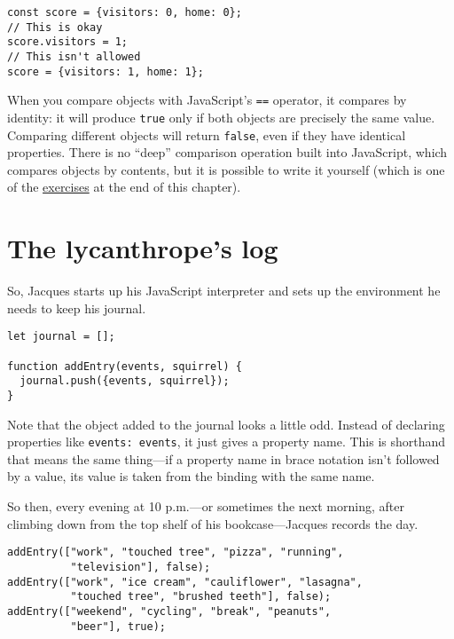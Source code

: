 \begin{lstlisting}
const score = {visitors: 0, home: 0};
// This is okay
score.visitors = 1;
// This isn't allowed
score = {visitors: 1, home: 1};
\end{lstlisting}
\noindent{}

When you compare objects with JavaScript's \lstinline`==` operator, it compares by identity: it will produce \lstinline`true` only if both objects are precisely the same value. Comparing different objects will return \lstinline`false`, even if they have identical properties. There is no ``deep'' comparison operation built into JavaScript, which compares objects by contents, but it is possible to write it yourself (which is one of the \hyperref[data.exercise_deep_compare]{exercises} at the end of this chapter).

\section{The lycanthrope's log}

So, Jacques starts up his JavaScript interpreter and sets up the environment he needs to keep his journal.

\begin{lstlisting}
let journal = [];

function addEntry(events, squirrel) {
  journal.push({events, squirrel});
}
\end{lstlisting}
\noindent{}

Note that the object added to the journal looks a little odd. Instead of declaring properties like \lstinline`events: events`, it just gives a property name. This is shorthand that means the same thing—if a property name in brace notation isn't followed by a value, its value is taken from the binding with the same name.

So then, every evening at 10 p.m.—or sometimes the next morning, after climbing down from the top shelf of his bookcase—Jacques records the day.

\begin{lstlisting}
addEntry(["work", "touched tree", "pizza", "running",
          "television"], false);
addEntry(["work", "ice cream", "cauliflower", "lasagna",
          "touched tree", "brushed teeth"], false);
addEntry(["weekend", "cycling", "break", "peanuts",
          "beer"], true);
\end{lstlisting}
\noindent

